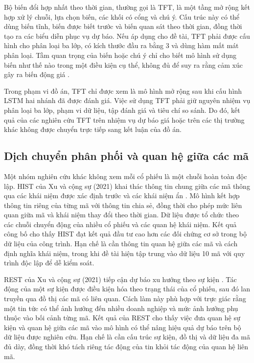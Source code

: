 Bộ biến đổi hợp nhất theo thời gian, thường gọi là TFT, là một tầng mở rộng kết hợp xử lý
chuỗi, lựa chọn biến, các khối có cổng và chú ý. Cấu trúc này có thể dùng biến
tĩnh, biến được biết trước và biến quan sát theo thời gian, đồng thời tạo ra các biểu
diễn phục vụ dự báo. Nếu áp dụng cho đề tài, TFT phải được cấu hình cho phân loại ba
lớp, có kích thước đầu ra bằng 3 và dùng hàm mất mát phân loại. Tầm quan trọng của biến hoặc chú ý
chỉ cho biết mô hình sử dụng biến như thế nào trong một điều kiện cụ thể, không đủ để
suy ra rằng cảm xúc gây ra biến động giá \cite{Lim2021_tft}.

Trong phạm vi đồ án, TFT chỉ được xem là mô hình mở rộng sau khi cấu hình LSTM hai
nhánh đã được đánh giá. Việc sử dụng TFT phải giữ nguyên nhiệm vụ phân loại ba lớp,
phạm vi dữ liệu, tập đánh giá và tiêu chí so sánh. Do đó, kết quả của các nghiên cứu
TFT trên nhiệm vụ dự báo giá hoặc trên các thị trường khác không được chuyển trực tiếp
sang kết luận của đồ án.

\subsection{Dịch chuyển phân phối và quan hệ giữa các mã}

Một nhóm nghiên cứu khác không xem mỗi cổ phiếu là một chuỗi hoàn toàn độc lập. HIST
của Xu và cộng sự (2021) khai thác thông tin chung giữa các mã thông qua các khái niệm
được xác định trước và các khái niệm ẩn \cite{Xu2021_211013716v2}. Mô hình kết hợp
thông tin riêng của từng mã với thông tin chia sẻ, đồng thời cho phép mức liên quan
giữa mã và khái niệm thay đổi theo thời gian. Dữ liệu được tổ chức theo các chuỗi
chuyển động của nhiều cổ phiếu và các quan hệ khái niệm. Kết quả công bố cho thấy HIST
đạt kết quả đầu tư cao hơn các đối chứng cơ sở trong bộ dữ liệu của công trình. Hạn chế là
cần thông tin quan hệ giữa các mã và cách định nghĩa khái niệm, trong khi đề tài hiện
tập trung vào dữ liệu 10 mã với quy trình độc lập để dễ kiểm soát.

REST của Xu và cộng sự (2021) tiếp cận dự báo xu hướng theo sự kiện
\cite{Xu2021_210207372v2}. Tác động của một sự kiện được điều kiện hóa theo trạng thái
của cổ phiếu, sau đó lan truyền qua đồ thị các mã có liên quan. Cách làm này phù hợp
với trực giác rằng một tin tức có thể ảnh hưởng đến nhiều doanh nghiệp và mức ảnh
hưởng phụ thuộc vào bối cảnh từng mã. Kết quả của REST cho thấy việc đưa quan hệ sự
kiện và quan hệ giữa các mã vào mô hình có thể nâng hiệu quả dự báo trên bộ dữ liệu
được nghiên cứu. Hạn chế là cần cấu trúc sự kiện, đồ thị và dữ liệu đa mã đủ dày, đồng
thời khó tách riêng tác động của tin khỏi tác động của quan hệ liên mã.

